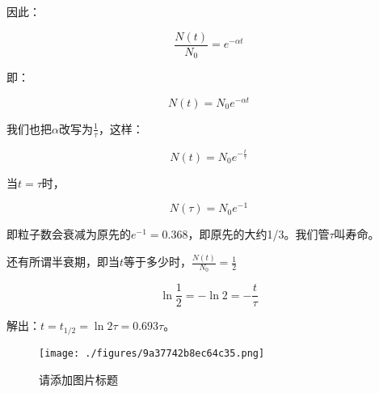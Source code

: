 因此：

\begin{equation}
\frac{N(t)}{N_0} = e^{- \alpha t}~
\end{equation}

即：

\begin{equation}
N(t) = N_0 e^{- \alpha t}~
\end{equation}

我们也把$\alpha$改写为$\frac{1}{\tau}$，这样：

\begin{equation}
N(t) = N_0 e^{- \frac{t}{\tau}}~
\end{equation}

当$t = \tau$时，

\begin{equation}
N(\tau) = N_0 e^{-1}~
\end{equation}

即粒子数会衰减为原先的$e^{-1} = 0.368$，即原先的大约1/3。我们管$\tau$叫寿命。

还有所谓半衰期，即当$t$等于多少时，$\frac{N(t)}{N_0} = \frac{1}{2}$

\begin{equation}
\ln \frac{1}{2} = - \ln 2 = - \frac{t }{\tau}~
\end{equation}

解出：$t = t_{1/2} = \ln 2 \tau = 0.693 \tau$。
\begin{figure}[ht]
\centering
\texttt{[image: ./figures/9a37742b8ec64c35.png]}
\caption{请添加图片标题} \label{fig_QMPre_1}
\end{figure}
